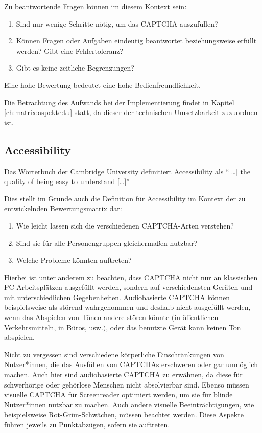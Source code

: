 Zu beantwortende Fragen können im diesem Kontext sein:
\begin{enumerate}
    \item Sind nur wenige Schritte nötig, um das CAPTCHA auszufüllen?
    \item Können Fragen oder Aufgaben eindeutig beantwortet beziehungsweise erfüllt werden? Gibt eine Fehlertoleranz?
    \item Gibt es keine zeitliche Begrenzungen?
\end{enumerate}

Eine hohe Bewertung bedeutet eine hohe Bedienfreundlichkeit. 

Die Betrachtung des Aufwands bei der Implementierung findet in Kapitel \ref{ch:matrix:aspekte:tu} statt, da dieser der technischen Umsetzbarkeit zuzuordnen ist.

\subsection{Accessibility}
\label{ch:matrix:aspekte:accessibility}
Das Wörterbuch der Cambridge University definitiert Accessibility als ``$[$\dots$]$ the quality of being easy to understand $[$\dots$]$'' \cite{CACD:2008}

Dies stellt im Grunde auch die Definition für Accessibility im Kontext der zu entwickelnden Bewertungsmatrix dar:

\begin{enumerate}
\item Wie leicht lassen sich die verschiedenen CAPTCHA-Arten verstehen?
\item Sind sie für alle Personengruppen gleichermaßen nutzbar?
\item Welche Probleme könnten auftreten?
\end{enumerate}

Hierbei ist unter anderem zu beachten, dass CAPTCHA nicht nur an klassischen PC-Arbeitsplätzen ausgefüllt werden,
sondern auf verschiedensten Geräten und mit unterschiedlichen Gegebenheiten.
Audiobasierte CAPTCHA können beispielsweise als störend wahrgenommen und deshalb nicht ausgefüllt werden,
wenn das Abspielen von Tönen andere stören könnte $($in öffentlichen Verkehrsmitteln, in Büros, usw.$)$,
oder das benutzte Gerät kann keinen Ton abspielen.

Nicht zu vergessen sind verschiedene körperliche Einschränkungen von Nutzer*innen,
die das Ausfüllen von CAPTCHAs erschweren oder gar unmöglich machen. Auch hier sind audiobasierte CAPTCHA zu erwähnen,
da diese für schwerhörige oder gehörlose Menschen nicht absolvierbar sind.
Ebenso müssen visuelle CAPTCHA für Screenreader optimiert werden, um sie für blinde Nutzer*innen nutzbar zu machen.
Auch andere visuelle Beeinträchtigungen, wie beispielsweise Rot-Grün-Schwächen, müssen beachtet werden.
Diese Aspekte führen jeweils zu Punktabzügen, sofern sie auftreten.

